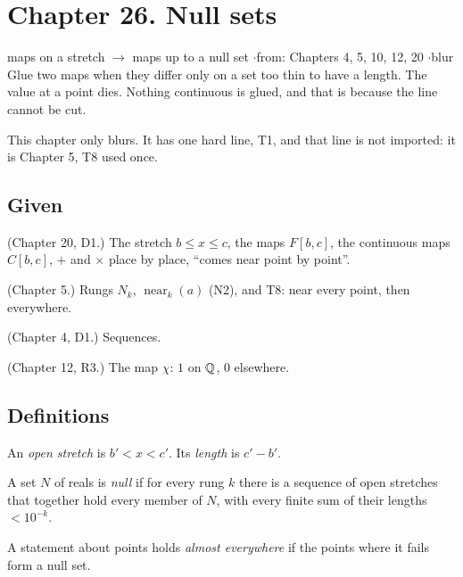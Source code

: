 \newpage

\section*{Chapter 26. Null sets}
\begin{center}
{\normalsize maps on a stretch $\to$ maps up to a null set \quad$\cdot$\quad from: Chapters 4, 5, 10, 12, 20 \quad$\cdot$\quad blur}\\[4pt]
{\small Glue two maps when they differ only on a set too thin to have a length. The value at a point dies. Nothing continuous is glued, and that is because the line cannot be cut.}
\end{center}

This chapter only blurs. It has one hard line, T1, and that line is not imported: it is Chapter 5, T8 used once.

\subsection*{Given}

\begin{lines}
\item[\lab{G1}] (Chapter 20, D1.) The stretch $b \le x \le c$, the maps $F[b,c]$, the continuous maps $C[b,c]$, $+$ and $\times$ place by place, ``comes near point by point''.
\item[\lab{G2}] (Chapter 5.) Rungs $N_k$, $\operatorname{near}_k(a)$ (N2), and T8: near every point, then everywhere.
\item[\lab{G3}] (Chapter 4, D1.) Sequences.
\item[\lab{G4}] (Chapter 12, R3.) The map $\chi$: $1$ on $\mathbb{Q}$, $0$ elsewhere.
\end{lines}

\subsection*{Definitions}

\begin{lines}
\item[\lab{D1}] An \emph{open stretch} is $b' < x < c'$. Its \emph{length} is $c' - b'$.
\item[\lab{D2}] A set $N$ of reals is \emph{null} if for every rung $k$ there is a sequence of open stretches that together hold every member of $N$, with every finite sum of their lengths $< 10^{-k}$.
\item[\lab{D3}] A statement about points holds \emph{almost everywhere} if the points where it fails form a null set.
\end{lines}

